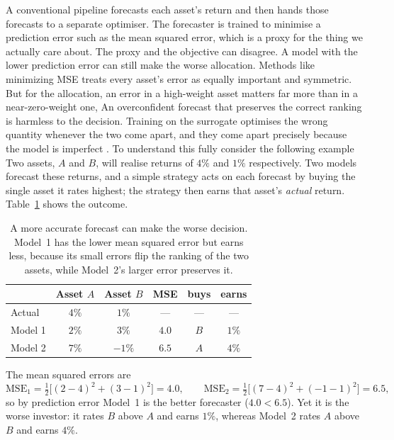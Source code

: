 A conventional pipeline forecasts each asset's return and then hands those forecasts to a separate optimiser. The forecaster is trained to minimise a prediction error such as the mean squared error, which is a proxy for the thing we actually care about. The proxy and the objective can disagree. A model with the lower prediction error can still make the worse allocation. Methods like minimizing MSE treats every asset's error as equally important and symmetric. But for the allocation, an error in a high-weight asset matters far more than in a near-zero-weight one, An overconfident forecast that preserves the correct ranking is harmless to the decision. Training on the surrogate optimises the wrong quantity whenever the two come apart, and they come apart precisely because the model is imperfect \cite{elmachtoub2022smart}. To understand this fully consider the following example  Two assets, $A$ and $B$, will realise returns of $4\%$ and $1\%$ respectively. Two models forecast these returns, and a simple strategy acts on each forecast by buying the single asset it rates highest; the strategy then earns that asset's \emph{actual} return. Table~\ref{tab:mse-vs-decision} shows the outcome.

\begin{table}[h]
  \centering
  \begin{tabular}{lccccc}
    \hline
             & Asset $A$ & Asset $B$ & MSE & buys & earns \\
    \hline
    Actual   & $4\%$ & $1\%$   & ---  & ---   & ---   \\
    Model 1  & $2\%$ & $3\%$   & $4.0$ & $B$   & $1\%$ \\
    Model 2  & $7\%$ & $-1\%$  & $6.5$ & $A$   & $4\%$ \\
    \hline
  \end{tabular}
  \caption{A more accurate forecast can make the worse decision. Model~1 has the lower mean squared error but earns less, because its small errors flip the ranking of the two assets, while Model~2's larger error preserves it.}
  \label{tab:mse-vs-decision}
\end{table}

The mean squared errors are
\begin{equation}
  \mathrm{MSE}_1 = \tfrac{1}{2}\big[(2-4)^2 + (3-1)^2\big] = 4.0,
  \qquad
  \mathrm{MSE}_2 = \tfrac{1}{2}\big[(7-4)^2 + (-1-1)^2\big] = 6.5,
\end{equation}
so by prediction error Model~1 is the better forecaster ($4.0 < 6.5$). Yet it is the worse investor: it rates $B$ above $A$ and earns $1\%$, whereas Model~2 rates $A$ above $B$ and earns $4\%$.

